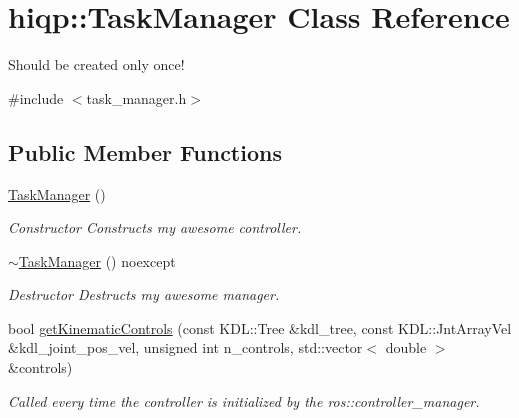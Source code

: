 \hypertarget{classhiqp_1_1TaskManager}{\section{hiqp\-:\-:Task\-Manager Class Reference}
\label{classhiqp_1_1TaskManager}
}


Should be created only once!  




{\ttfamily \#include $<$task\-\_\-manager.\-h$>$}

\subsection*{Public Member Functions}
\begin{DoxyCompactItemize}
\item 
\hypertarget{classhiqp_1_1TaskManager_af190d8f0b3ee1c0d32acdb70fae6e03d}{\hyperlink{classhiqp_1_1TaskManager_af190d8f0b3ee1c0d32acdb70fae6e03d}{Task\-Manager} ()}\label{classhiqp_1_1TaskManager_af190d8f0b3ee1c0d32acdb70fae6e03d}

\begin{DoxyCompactList}\small\item\em Constructor Constructs my awesome controller. \end{DoxyCompactList}\item 
\hypertarget{classhiqp_1_1TaskManager_a688ad548e2ef681b458c1fc90326f6e6}{\hyperlink{classhiqp_1_1TaskManager_a688ad548e2ef681b458c1fc90326f6e6}{$\sim$\-Task\-Manager} () noexcept}\label{classhiqp_1_1TaskManager_a688ad548e2ef681b458c1fc90326f6e6}

\begin{DoxyCompactList}\small\item\em Destructor Destructs my awesome manager. \end{DoxyCompactList}\item 
bool \hyperlink{classhiqp_1_1TaskManager_a9243435c3819b03a9874f47d985a2147}{get\-Kinematic\-Controls} (const K\-D\-L\-::\-Tree \&kdl\-\_\-tree, const K\-D\-L\-::\-Jnt\-Array\-Vel \&kdl\-\_\-joint\-\_\-pos\-\_\-vel, unsigned int n\-\_\-controls, std\-::vector$<$ double $>$ \&controls)
\begin{DoxyCompactList}\small\item\em Called every time the controller is initialized by the ros\-::controller\-\_\-manager. \end{DoxyCompactList}\end{DoxyCompactItemize}



